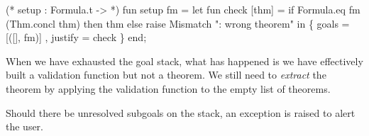 \nwenddocs{}\endmoddef\nwstartdeflinemarkup{}\nwenddeflinemarkup
(* setup : Formula.t ->  *)
fun setup fm =
  let
    fun check [thm] =
      if Formula.eq fm (Thm.concl thm)
      then thm
      else raise Mismatch ": wrong theorem"
  in
    \{ goals = [([], fm)]
    , justify = check \}
  end;
\eatline
{}\nwendcode{}\nwdocspar
\begin{node}
When we have exhausted the goal stack, what has happened is we have
effectively built a validation function but not a theorem. We still
need to \emph{extract} the theorem by applying the validation function
to the empty list of theorems.

Should there be unresolved subgoals on the stack, an exception is
raised to alert the user.
\end{node}

